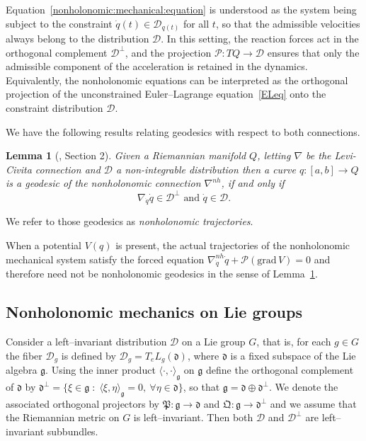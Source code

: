 \documentclass[letterpaper, 10 pt, conference]{ieeeconf}
\newtheorem{lemma}{Lemma}
\newcommand{\g}{\mathfrak{g}}
\newcommand{\h}{\mathfrak{d}}
\newcommand{\D}{\mathcal{D}}
\begin{document}
Equation~\eqref{nonholonomic:mechanical:equation} is understood as the system being subject to  the constraint 
$\dot q(t)\in \D_{q(t)}$ for all $t$, 
so that the admissible velocities always belong to the distribution $\D$. 
In this setting, the reaction forces act in the orthogonal complement $\D^\perp$, 
and the projection $\mathcal{P}:TQ\to \D$ ensures that only the admissible component 
of the acceleration is retained in the dynamics. 
Equivalently, the nonholonomic equations can be interpreted as the orthogonal 
projection of the unconstrained Euler--Lagrange equation~\eqref{ELeq} onto the 
constraint distribution $\D$.


 We have the following results relating geodesics with respect to both connections.


\begin{lemma}[\cite{bullo}, Section 2]\label{Lewis:lemma}
    Given a Riemannian manifold $Q$, letting $\nabla$ be the Levi-Civita connection and $\D$ a non-integrable distribution then a curve $q:[a,b]\to Q$ is a geodesic of the nonholonomic connection $\nabla^{nh}$, if and only if
    $$\nabla_{\dot{q}}\dot{q} \in \D^{\bot} \text{ and } \dot{q} \in \D.
    $$
\end{lemma}
We refer to those geodesics as \textit{nonholonomic trajectories}. 

When a potential $V(q)$ is present, the actual trajectories of the 
nonholonomic mechanical system satisfy the forced equation 
$\nabla^{nh}_{\dot q}\dot q + \mathcal{P}(\mathrm{grad}\,V)=0$ 
and therefore need not be nonholonomic geodesics in the sense of 
Lemma~\ref{Lewis:lemma}.

\subsection{Nonholonomic mechanics on Lie groups}

Consider a left--invariant distribution $\D$ on a Lie group $G$, that is, for each 
$g\in G$ the fiber $\D_g$ is defined by $\D_g = T_e L_g(\h)$, where $\h$ is a fixed 
subspace of the Lie algebra $\g$.  
Using the inner product $\langle\cdot,\cdot\rangle_{\g}$ on $\g$ define the 
orthogonal complement of $\h$ by $\h^\perp=\{\xi\in\g\;:\;\langle\xi,\eta\rangle_{\g}=0,\ \forall\eta\in\h\}$, so that $\g=\h\oplus \h^\perp$.  
We denote the associated orthogonal projectors by 
$\mathfrak{P}:\g\to\h$ and $\mathfrak{Q}:\g\to\h^\perp$ and we assume that the 
Riemannian metric on $G$ is left--invariant.  
Then both $\D$ and $\D^\perp$ are left--invariant subbundles.
\end{document}
